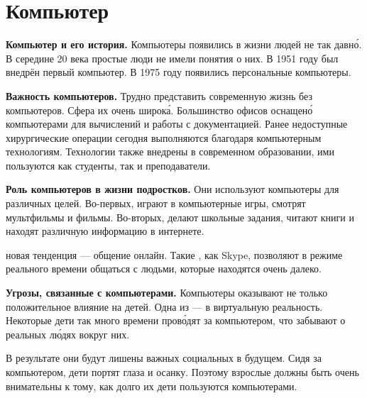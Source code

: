 \section{Компьютер}
\textbf{Компьютер и его история.} Компьютеры появились в жизни людей не так давн\'{о}. В середине 20 века простые люди не имели понятия о них. В 1951 году был внедрён первый  компьютер. В 1975 году появились персональные компьютеры.

\textbf{Важность компьютеров.} Трудно представить современную жизнь без компьютеров. Сфера их  очень широк\'{а}.
Большинство офисов оснащен\'{о} компьютерами для вычислений и работы с документацией. Ранее недоступные хирургические операции сегодня выполняются благодаря компьютерным технологиям. Технологии также внедрены в современном образовании, ими пользуются как студенты, так и преподаватели.

\textbf{Роль компьютеров в жизни подростков.}
Они используют компьютеры для различных целей. Во-первых, играют в компьютерные игры, смотрят мультфильмы и фильмы. Во-вторых, делают школьные задания, читают книги и находят различную информацию в интернете.

 новая тенденция --- общение онлайн. Такие , как Skype, позволяют в режиме реального времени общаться с людьми, которые находятся очень далеко.

\textbf{Угрозы, связанные с компьютерами.}
Компьютеры оказывают не только положительное влияние на детей. Одна из  ---  в виртуальную реальность. Некоторые дети так много времени пров\'{о}дят за компьютером, что забывают о реальных л\'{ю}дях вокруг них.

В результате они будут лишены важных социальных  в будущем. Сидя за компьютером, дети портят глаза и осанку. Поэтому взрослые должны быть очень внимательны к тому, как долго их дети пользуются компьютерами.



\clearpage

